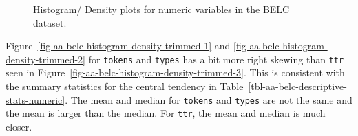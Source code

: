 \documentclass[
  letterpaper,
]{latex/krantz}
\theoremstyle{definition}
\theoremstyle{remark}
\begin{document}
\begin{figure}[H]
\begin{minipage}{0.33\linewidth}
{}


\end{minipage}%
%
\begin{minipage}{0.33\linewidth}



\end{minipage}%

\caption{\label{fig-aa-belc-histogram-density-trimmed}Histogram/ Density
plots for numeric variables in the BELC dataset.}

\end{figure}%

Figure~\ref{fig-aa-belc-histogram-density-trimmed-1} and
\ref{fig-aa-belc-histogram-density-trimmed-2} for \texttt{tokens} and
\texttt{types} has a bit more right skewing than \texttt{ttr} seen in
Figure~\ref{fig-aa-belc-histogram-density-trimmed-3}. This is consistent
with the summary statistics for the central tendency in
Table~\ref{tbl-aa-belc-descriptive-stats-numeric}. The mean and median
for \texttt{tokens} and \texttt{types} are not the same and the mean is
larger than the median. For \texttt{ttr}, the mean and median is much
closer.
\end{document}
